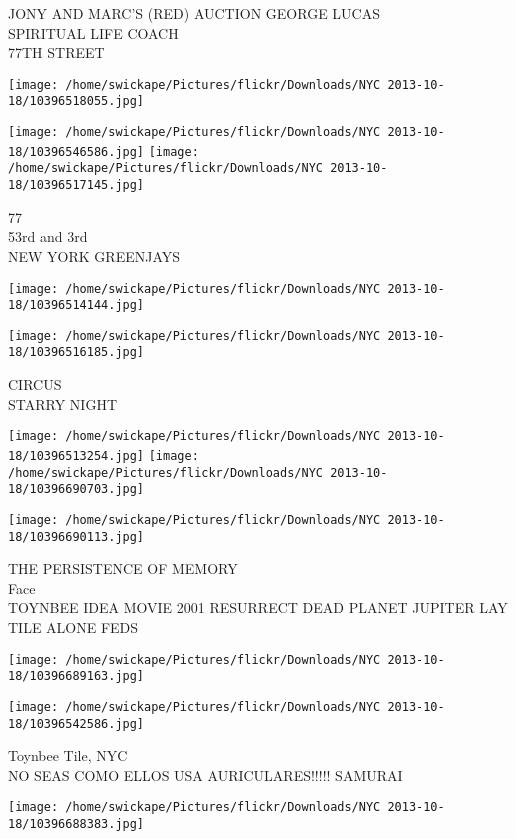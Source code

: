 \documentclass[10pt,letterpaper]{article}
\begin{document}
JONY AND MARC'S (RED) AUCTION GEORGE LUCAS\\
SPIRITUAL LIFE COACH\\
77TH STREET
\pagebreak

\texttt{[image: /home/swickape/Pictures/flickr/Downloads/NYC 2013-10-18/10396518055.jpg]}

\vspace{0.25in}
\texttt{[image: /home/swickape/Pictures/flickr/Downloads/NYC 2013-10-18/10396546586.jpg]}
\texttt{[image: /home/swickape/Pictures/flickr/Downloads/NYC 2013-10-18/10396517145.jpg]}

77\\
53rd and 3rd\\
NEW YORK GREENJAYS
\pagebreak

\texttt{[image: /home/swickape/Pictures/flickr/Downloads/NYC 2013-10-18/10396514144.jpg]}

\vspace{0.25in}
\texttt{[image: /home/swickape/Pictures/flickr/Downloads/NYC 2013-10-18/10396516185.jpg]}

CIRCUS\\
STARRY NIGHT
\pagebreak

\texttt{[image: /home/swickape/Pictures/flickr/Downloads/NYC 2013-10-18/10396513254.jpg]}
\texttt{[image: /home/swickape/Pictures/flickr/Downloads/NYC 2013-10-18/10396690703.jpg]}

\vspace{0.25in}
\texttt{[image: /home/swickape/Pictures/flickr/Downloads/NYC 2013-10-18/10396690113.jpg]}

THE PERSISTENCE OF MEMORY\\
Face\\
TOYNBEE IDEA MOVIE 2001 RESURRECT DEAD PLANET JUPITER LAY TILE ALONE FEDS
\pagebreak

\texttt{[image: /home/swickape/Pictures/flickr/Downloads/NYC 2013-10-18/10396689163.jpg]}

\vspace{0.25in}
\texttt{[image: /home/swickape/Pictures/flickr/Downloads/NYC 2013-10-18/10396542586.jpg]}

Toynbee Tile, NYC\\
NO SEAS COMO ELLOS USA AURICULARES!!!!! SAMURAI
\pagebreak

\texttt{[image: /home/swickape/Pictures/flickr/Downloads/NYC 2013-10-18/10396688383.jpg]}
\end{document}
